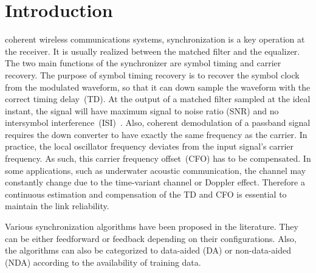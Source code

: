 \documentclass[journal,comsoc,onecolumn, 12pt,draftclsnofoot]{IEEEtran}
\begin{document}
\section{Introduction}
\label{sec:intro}
 coherent wireless communications systems, synchronization is a key operation at the receiver.
It is usually realized between the matched filter and the equalizer.
The two main functions of the synchronizer are symbol timing and carrier recovery.
The purpose of symbol timing recovery is to recover the symbol clock from the modulated waveform, so that it can down sample the waveform with the correct timing delay~(TD).
At the output of a matched filter sampled at the ideal instant, the signal will have maximum signal to noise ratio (SNR) and no intersymbol interference~(ISI)~\cite{mengali1997synchronization}.
Also, coherent demodulation of a passband signal requires the down converter to have exactly the same frequency as the carrier. 
In practice, the local oscillator frequency deviates from the input signal's carrier frequency.  
As such, this carrier frequency offset~(CFO) has to be compensated. 
In some applications, such as underwater acoustic communication, the channel may constantly change due to the time-variant channel or Doppler effect. 
Therefore a continuous estimation and compensation of the TD and CFO is essential to maintain the link reliability.

Various synchronization algorithms have been proposed in the literature.
They can be either feedforward or feedback depending on their configurations.
Also, the algorithms can also be categorized to data-aided (DA) or non-data-aided (NDA) according to the availability of training data.



\end{document}
